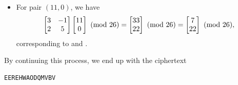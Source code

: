 \documentclass[letterpaper]{article}
\begin{document}
\begin{mdframed}
\begin{mdframed}
\begin{itemize}
            \item For pair $(11, 0)$, we have 
            \[\begin{bmatrix}
                3 & -1 \\ 2 & 5
            \end{bmatrix} \begin{bmatrix}
                11 \\ 0
            \end{bmatrix} \ (\mathrm{mod}\ 26) = \begin{bmatrix}
                33 \\ 22
            \end{bmatrix} \ (\mathrm{mod}\ 26) = \begin{bmatrix}
                7 \\ 22
            \end{bmatrix} \ (\mathrm{mod}\ 26),\]
            corresponding to  and .
        \end{itemize}
        By continuing this process, we end up with the ciphertext 
        \begin{mdframed}
\begin{verbatim}
EEREHWAODQMVBV\end{verbatim}
        \end{mdframed}
    \end{mdframed}
\end{mdframed}
\end{document}
